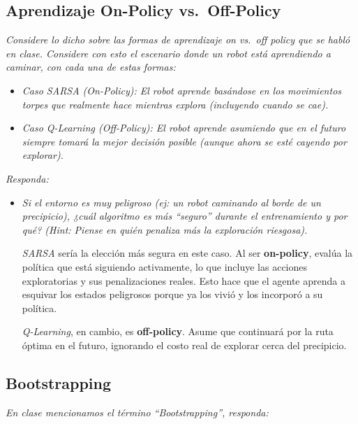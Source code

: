 \documentclass[11pt]{article}
\begin{document}
\subsection*{Aprendizaje On-Policy vs.\ Off-Policy}
\textit{Considere lo dicho sobre las formas de aprendizaje on vs.\ off policy que se habló en clase. Considere con
esto el escenario donde un robot está aprendiendo a caminar, con cada una de estas formas:}

\begin{itemize}[leftmargin=*]
\item \textit{Caso SARSA (On-Policy): El robot aprende basándose en los movimientos torpes que realmente hace
    mientras explora (incluyendo cuando se cae).}
\item \textit{Caso Q-Learning (Off-Policy): El robot aprende asumiendo que en el futuro siempre tomará la mejor
    decisión posible (aunque ahora se esté cayendo por explorar).}
\end{itemize}

\noindent\textit{Responda:}

\begin{itemize}[leftmargin=*, itemsep=0.8em]

\item \textit{Si el entorno es muy peligroso (ej: un robot caminando al borde de un precipicio), ¿cuál algoritmo
    es más ``seguro'' durante el entrenamiento y por qué? (Hint: Piense en quién penaliza más la exploración riesgosa).}

    \textit{SARSA} sería la elección más segura en este caso. Al ser \textbf{on-policy}, evalúa la política que
    está siguiendo activamente, lo que incluye las acciones exploratorias y sus penalizaciones reales. Esto hace
    que el agente aprenda a esquivar los estados peligrosos porque ya los vivió y los incorporó a su política.

    \textit{Q-Learning}, en cambio, es \textbf{off-policy}. Asume que continuará por la ruta óptima en el futuro,
    ignorando el costo real de explorar cerca del precipicio.

\end{itemize}

\subsection*{Bootstrapping}
\textit{En clase mencionamos el término ``Bootstrapping'', responda:}
\end{document}
